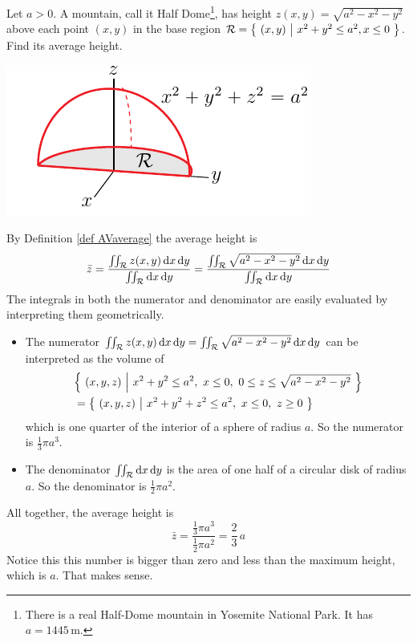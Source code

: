\begin{eg}[Average]\label{eg dblInt G}
Let $a>0$. A mountain, call it Half Dome\footnote{There is a real Half-Dome
mountain in Yosemite National Park. It has $a=1445\,\text{m}$. }, has height 
$z(x,y)=\sqrt{a^2-x^2-y^2}$ above each point $(x,y)$
in the base region $\mathcal{R}=\big\{ \ (x,y)\ \big|\ x^2+y^2\le a^2, x\le 0\ \big\}$.
Find its average height.

\begin{efig}
\begin{center}
   \includegraphics{halfDomeA.pdf}
\end{center}
\end{efig}


\soln
By Definition \ref{def AVaverage} the average height is
\begin{equation*}
\bar z
=\frac{\iint_{\mathcal{R}} z(x,y)\,\mathrm{d}x\,\mathrm{d}y}
                       {\iint_{\mathcal{R}} \mathrm{d}x\,\mathrm{d}y}
=\frac{\iint_{\mathcal{R}} \sqrt{a^2-x^2-y^2}\,\mathrm{d}x\,\mathrm{d}y}
                       {\iint_{\mathcal{R}} \mathrm{d}x\,\mathrm{d}y}
\end{equation*}
The integrals in both the numerator and denominator
are easily evaluated by interpreting them geometrically.
\begin{itemize}
\item
The numerator $\iint_{\mathcal{R}} z(x,y)\,\mathrm{d}x\,\mathrm{d}y
                =\iint_{\mathcal{R}} \sqrt{a^2-x^2-y^2}\,\mathrm{d}x\,\mathrm{d}y$
can be interpreted as the volume of
\begin{align*}
&\Big\{\ (x,y,z)\ \Big|\ x^2+y^2\le a^2,\ x\le 0,\ 
             0\le z\le  \sqrt{a^2-x^2-y^2}\ \Big\} \\
&=\Set{(x,y,z)}{x^2+y^2+z^2\le a^2,\ x\le 0,\ z\ge 0}
\end{align*}
which is one quarter of the interior of a sphere of radius $a$.
So the numerator is $\frac{1}{3}\pi a^3$.

\item 
The denominator $\iint_{\mathcal{R}} \mathrm{d}x\,\mathrm{d}y$ is the area of 
one half of a circular disk of radius $a$. So the denominator
is $\frac{1}{2} \pi a^2$.

\end{itemize}
All together, the average height is
\begin{equation*}
\bar z = \frac{\frac{1}{3}\pi a^3}{\frac{1}{2} \pi a^2}
=\frac{2}{3}\, a
\end{equation*}
Notice this this number is bigger than zero and less than the maximum height,
which is $a$. That makes sense.

\end{eg}


